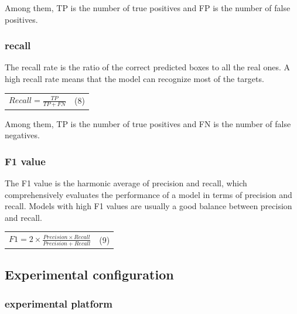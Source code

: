 \documentclass[
]{article}
\newcounter{none} %
\begin{document}
Among them, TP is the number of true positives and FP is the number of
false positives.

\subsubsection{recall}\label{recall}

The recall rate is the ratio of the correct predicted boxes to all the
real ones. A high recall rate means that the model can recognize most of
the targets.

{\def\LTcaptype{none} %
\begin{longtable}[]{@{}
  >{\raggedright\arraybackslash}p{}
  >{\centering\arraybackslash}p{}@{}}
\toprule\noalign{}
\endhead
\bottomrule\noalign{}
\endlastfoot
\(Recall = \frac{TP}{TP + FN}\) & (8) \\
\end{longtable}
}

Among them, TP is the number of true positives and FN is the number of
false negatives.

\subsubsection{F1 value}\label{f1-value}

The F1 value is the harmonic average of precision and recall, which
comprehensively evaluates the performance of a model in terms of
precision and recall. Models with high F1 values are usually a good
balance between precision and recall.

{\def\LTcaptype{none} %
\begin{longtable}[]{@{}
  >{\raggedright\arraybackslash}p{}
  >{\centering\arraybackslash}p{}@{}}
\toprule\noalign{}
\endhead
\bottomrule\noalign{}
\endlastfoot
\(F1 = 2 \times \frac{Precision \times Recall}{Precision + Recall}\) &
(9) \\
\end{longtable}
}

\subsection{Experimental
configuration}\label{experimental-configuration}

\subsubsection{experimental platform}\label{experimental-platform}
\end{document}
